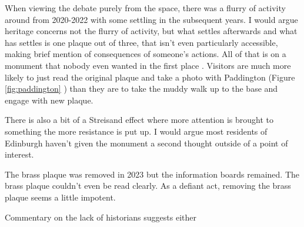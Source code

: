 When viewing the debate purely from the space, there was a flurry of activity around from 2020-2022 with some settling in the subsequent years. I would argue heritage concerns not the flurry of activity, but what settles afterwards and what has settles is one plaque out of three, that isn't even particularly accessible, making brief mention of consequences of someone's actions. All of that is on a monument that nobody even wanted in the first place \cite{godard_2018}.  Visitors are much more likely to just read the original plaque and take a photo with Paddington (Figure \ref{fig:paddington} ) than they are to take the muddy walk up to the base and engage with new plaque.

There is also a bit of a Streisand effect where more attention is brought to something the more resistance is put up. I would argue most residents of Edinburgh haven't given the monument a second thought outside of a point of interest.

The brass plaque was removed in 2023 but the information boards remained. The brass plaque couldn't even be read clearly. As a defiant act, removing the brass plaque seems a little impotent.

Commentary on the lack of historians suggests either

